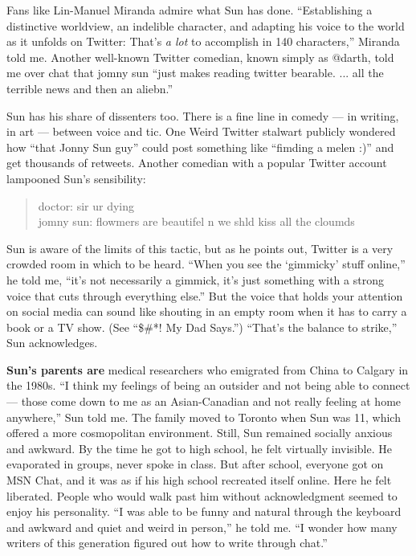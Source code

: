 Fans like Lin-Manuel Miranda admire what Sun has done. ``Establishing a
distinctive worldview, an indelible character, and adapting his voice to
the world as it unfolds on Twitter: That's \emph{a lot} to accomplish in
140 characters,'' Miranda told me. Another well-known Twitter comedian,
known simply as @darth, told me over chat that jomny sun ``just makes
reading twitter bearable. ... all the terrible news and then an
aliebn.''

Sun has his share of dissenters too. There is a fine line in comedy ---
in writing, in art --- between voice and tic. One Weird Twitter stalwart
publicly wondered how ``that Jonny Sun guy'' could post something like
``fimding a melen :)'' and get thousands of retweets. Another comedian
with a popular Twitter account lampooned Sun's sensibility:

\begin{quote}
doctor: sir ur dying\\
jomny sun: flowmers are beautifel n we shld kiss all the cloumds
\end{quote}

Sun is aware of the limits of this tactic, but as he points out, Twitter
is a very crowded room in which to be heard. ``When you see the
`gimmicky' stuff online,'' he told me, ``it's not necessarily a gimmick,
it's just something with a strong voice that cuts through everything
else.'' But the voice that holds your attention on social media can
sound like shouting in an empty room when it has to carry a book or a TV
show. (See ``\$\#*! My Dad Says.'') ``That's the balance to strike,''
Sun acknowledges.

\textbf{Sun's parents are} medical researchers who emigrated from China
to Calgary in the 1980s. ``I think my feelings of being an outsider and
not being able to connect --- those come down to me as an Asian-Canadian
and not really feeling at home anywhere,'' Sun told me. The family moved
to Toronto when Sun was 11, which offered a more cosmopolitan
environment. Still, Sun remained socially anxious and awkward. By the
time he got to high school, he felt virtually invisible. He evaporated
in groups, never spoke in class. But after school, everyone got on MSN
Chat, and it was as if his high school recreated itself online. Here he
felt liberated. People who would walk past him without acknowledgment
seemed to enjoy his personality. ``I was able to be funny and natural
through the keyboard and awkward and quiet and weird in person,'' he
told me. ``I wonder how many writers of this generation figured out how
to write through chat.''


